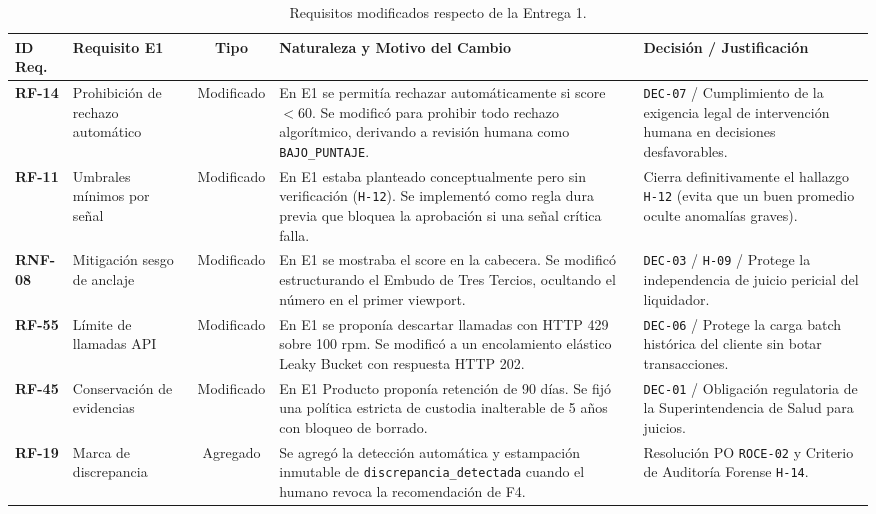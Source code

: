 \documentclass[11pt,letterpaper]{article}
\begin{document}
\begin{table}[h]
\centering
\scriptsize
\begin{tabularx}{\textwidth}{l P{2.6cm} c P{4.2cm} Y}
\toprule
\textbf{ID Req.} & \textbf{Requisito E1} & \textbf{Tipo} & \textbf{Naturaleza y Motivo del Cambio} & \textbf{Decisión / Justificación} \\
\midrule
\textbf{RF-14} & Prohibición de rechazo automático & Modificado & En E1 se permitía rechazar automáticamente si score $<60$. Se modificó para prohibir todo rechazo algorítmico, derivando a revisión humana como \texttt{BAJO\_PUNTAJE}. & \texttt{DEC-07} / Cumplimiento de la exigencia legal de intervención humana en decisiones desfavorables. \\
\textbf{RF-11} & Umbrales mínimos por señal & Modificado & En E1 estaba planteado conceptualmente pero sin verificación (\texttt{H-12}). Se implementó como regla dura previa que bloquea la aprobación si una señal crítica falla. & Cierra definitivamente el hallazgo \texttt{H-12} (evita que un buen promedio oculte anomalías graves). \\
\textbf{RNF-08} & Mitigación sesgo de anclaje & Modificado & En E1 se mostraba el score en la cabecera. Se modificó estructurando el Embudo de Tres Tercios, ocultando el número en el primer viewport. & \texttt{DEC-03} / \texttt{H-09} / Protege la independencia de juicio pericial del liquidador. \\
\textbf{RF-55} & Límite de llamadas API & Modificado & En E1 se proponía descartar llamadas con HTTP 429 sobre 100 rpm. Se modificó a un encolamiento elástico Leaky Bucket con respuesta HTTP 202. & \texttt{DEC-06} / Protege la carga batch histórica del cliente sin botar transacciones. \\
\textbf{RF-45} & Conservación de evidencias & Modificado & En E1 Producto proponía retención de 90 días. Se fijó una política estricta de custodia inalterable de 5 años con bloqueo de borrado. & \texttt{DEC-01} / Obligación regulatoria de la Superintendencia de Salud para juicios. \\
\textbf{RF-19} & Marca de discrepancia & Agregado & Se agregó la detección automática y estampación inmutable de \texttt{discrepancia\_detectada} cuando el humano revoca la recomendación de F4. & Resolución PO \texttt{ROCE-02} y Criterio de Auditoría Forense \texttt{H-14}. \\
\bottomrule
\end{tabularx}
\caption{Requisitos modificados respecto de la Entrega 1.}
\label{tab:req-cambiados}
\end{table}
\end{document}
